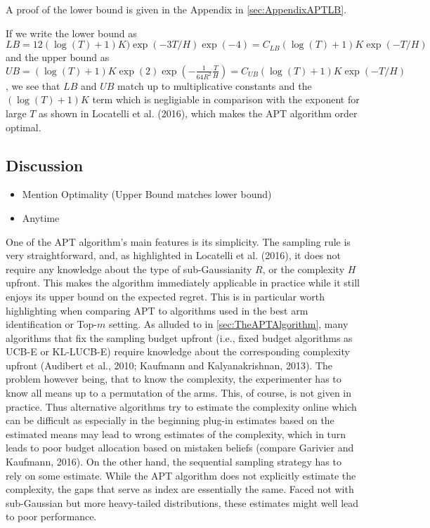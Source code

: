 \documentclass[11pt,]{article}
\providecommand{\tightlist}{%
  \setlength{\itemsep}{0pt}\setlength{\parskip}{0pt}}
\begin{document}
A proof of the lower bound is given in the Appendix in
\autoref{sec:AppendixAPTLB}.

If we write the lower bound as
\(LB = 12(\log(T)+1)K)\exp(-3T/H)\exp(-4) = C_{LB}(\log(T)+1)K\exp(-T/H)\)
and the upper bound as
\(UB = (\log(T)+1)K \exp(2) \exp(-\frac{1}{64R^2}\frac{T}{H}) = C_{UB}(\log(T)+1)K\exp(-T/H)\),
we see that \(LB\) and \(UB\) match up to multiplicative constants and
the \((\log(T)+1)K\) term which is negligiable in comparison with the
exponent for large \(T\) as shown in Locatelli et al. (2016), which
makes the APT algorithm order optimal.

\subsection{\texorpdfstring{Discussion
\label{sec:DiscussionLocatelli}}{Discussion }}\label{discussion}

\begin{itemize}
\tightlist
\item
  Mention Optimality (Upper Bound matches lower bound)
\item
  Anytime
\end{itemize}

One of the APT algorithm's main features is its simplicity. The sampling
rule is very straightforward, and, as highlighted in Locatelli et al.
(2016), it does not require any knowledge about the type of
sub-Gaussianity \(R\), or the complexity \(H\) upfront. This makes the
algorithm immediately applicable in practice while it still enjoys its
upper bound on the expected regret. This is in particular worth
highlighting when comparing APT to algorithms used in the best arm
identification or Top-\(m\) setting. As alluded to in
\autoref{sec:TheAPTAlgorithm}, many algorithms that fix the sampling
budget upfront (i.e., fixed budget algorithms as UCB-E or KL-LUCB-E)
require knowledge about the corresponding complexity upfront (Audibert
et al., 2010; Kaufmann and Kalyanakrishnan, 2013). The problem however
being, that to know the complexity, the experimenter has to know all
means up to a permutation of the arms. This, of course, is not given in
practice. Thus alternative algorithms try to estimate the complexity
online which can be difficult as especially in the beginning plug-in
estimates based on the estimated means may lead to wrong estimates of
the complexity, which in turn leads to poor budget allocation based on
mistaken beliefs (compare Garivier and Kaufmann, 2016). On the other
hand, the sequential sampling strategy has to rely on some estimate.
While the APT algorithm does not explicitly estimate the complexity, the
gaps that serve as index are essentially the same. Faced not with
sub-Gaussian but more heavy-tailed distributions, these estimates might
well lead to poor performance.
\end{document}
